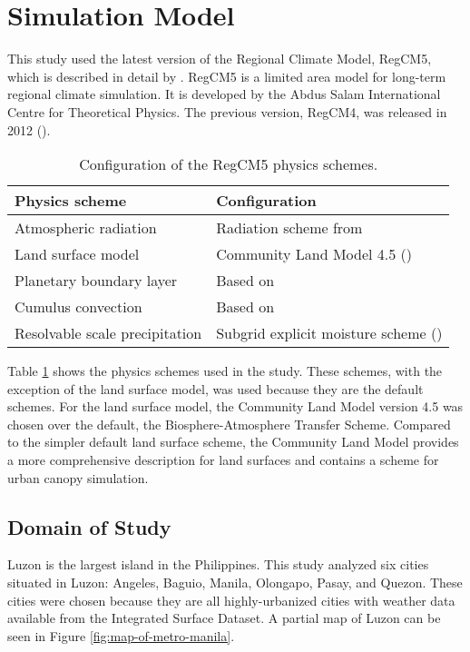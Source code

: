 \section{Simulation Model}
	This study used the latest version of the Regional Climate Model, RegCM5, which is described in detail by \textcite{Giorgi2023}.
	RegCM5 is a limited area model for long-term regional climate simulation.
	It is developed by the Abdus Salam International Centre for Theoretical Physics.
	The previous version, RegCM4, was released in 2012 (\cite{Giorgi2012}).
	
	\begin{table}	
		\caption{Configuration of the RegCM5 physics schemes.}
		\label{tab:physics-schemes}
		\centering
		\begin{tabular}{l l}
			\hline \hline
			Physics scheme & Configuration\\
			\hline
			Atmospheric radiation & Radiation scheme from \textcite{Kiehl1996} \\
			Land surface model & Community Land Model 4.5 (\cite{Oleson2013})\\
			Planetary boundary layer & Based on \textcite{Holtslag1990}\\
			Cumulus convection & Based on \textcite{Emanuel1991}\\
			Resolvable scale precipitation & Subgrid explicit moisture scheme (\cite{Pal2000})\\
			\hline
		\end{tabular}		
	\end{table}
	
	Table \ref{tab:physics-schemes} shows the physics schemes used in the study.
	These schemes, with the exception of the land surface model, was used because they are the default schemes. 
	For the land surface model, the Community Land Model version 4.5 was chosen over the default, the Biosphere-Atmosphere Transfer Scheme. 
	Compared to the simpler default land surface scheme, the Community Land Model provides a more comprehensive description for land surfaces and contains a scheme for urban canopy simulation.
	
	\subsection{Domain of Study}
		Luzon is the largest island in the Philippines.
		This study analyzed six cities situated in Luzon:
		Angeles,
		Baguio,
		Manila,
		Olongapo,
		Pasay,
		and
		Quezon.
		These cities were chosen because they are all highly-urbanized cities with weather data available from the Integrated Surface Dataset.
		A partial map of Luzon can be seen in Figure \ref{fig:map-of-metro-manila}.
		
